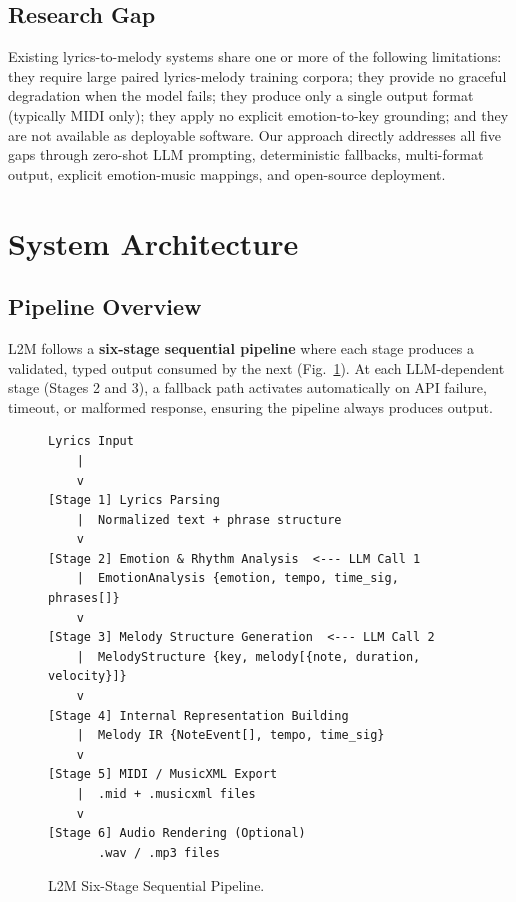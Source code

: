 \documentclass[conference]{IEEEtran}
\begin{document}
\subsection{Research Gap}

Existing lyrics-to-melody systems share one or more of the following
limitations: they require large paired lyrics-melody training corpora; they
provide no graceful degradation when the model fails; they produce only a
single output format (typically MIDI only); they apply no explicit
emotion-to-key grounding; and they are not available as deployable software.
Our approach directly addresses all five gaps through zero-shot LLM prompting,
deterministic fallbacks, multi-format output, explicit emotion-music mappings,
and open-source deployment.

\section{System Architecture}

\subsection{Pipeline Overview}

L2M follows a \textbf{six-stage sequential pipeline} where each stage produces
a validated, typed output consumed by the next (Fig.~\ref{fig:pipeline}). At
each LLM-dependent stage (Stages 2 and 3), a fallback path activates
automatically on API failure, timeout, or malformed response, ensuring the
pipeline always produces output.

\begin{figure}[htbp]
\centering
\begin{lstlisting}[style=pipelineStyle]
Lyrics Input
    |
    v
[Stage 1] Lyrics Parsing
    |  Normalized text + phrase structure
    v
[Stage 2] Emotion & Rhythm Analysis  <--- LLM Call 1
    |  EmotionAnalysis {emotion, tempo, time_sig, phrases[]}
    v
[Stage 3] Melody Structure Generation  <--- LLM Call 2
    |  MelodyStructure {key, melody[{note, duration, velocity}]}
    v
[Stage 4] Internal Representation Building
    |  Melody IR {NoteEvent[], tempo, time_sig}
    v
[Stage 5] MIDI / MusicXML Export
    |  .mid + .musicxml files
    v
[Stage 6] Audio Rendering (Optional)
       .wav / .mp3 files
\end{lstlisting}
\caption{L2M Six-Stage Sequential Pipeline.}
\label{fig:pipeline}
\end{figure}
\end{document}
